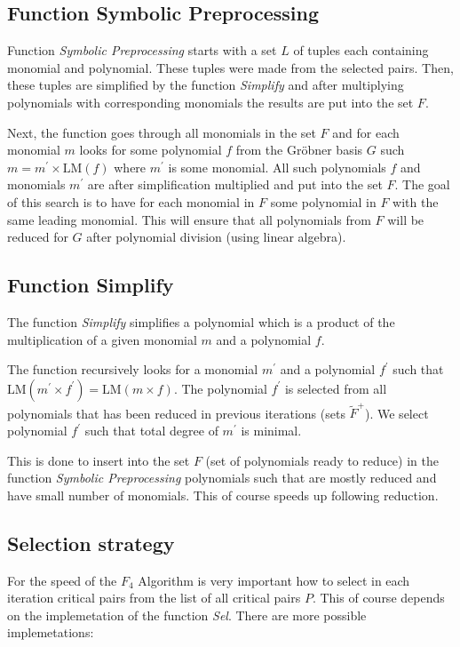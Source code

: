 

\subsection{Function Symbolic Preprocessing}
Function \textit{Symbolic Preprocessing} starts with a set $L$ of tuples each containing monomial and polynomial. These tuples were made from the selected pairs. Then, these tuples are simplified by the function \textit{Simplify} and after multiplying polynomials with corresponding monomials the results are put into the set $F$.

Next, the function goes through all monomials in the set $F$ and for each monomial $m$ looks for some polynomial $f$ from the Gr\"obner basis $G$ such $m = m^\prime \times \textrm{LM}(f)$ where $m^\prime$ is some monomial. All such polynomials $f$ and monomials $m^\prime$ are after simplification multiplied and put into the set $F$. The goal of this search is to have for each monomial in $F$ some polynomial in $F$ with the same leading monomial. This will ensure that all polynomials from $F$ will be reduced for $G$ after polynomial division (using linear algebra).



\subsection{Function Simplify}
The function \textit{Simplify} simplifies a polynomial which is a product of the multiplication of a given monomial $m$ and a polynomial $f$.

The function recursively looks for a monomial $m^\prime$ and a polynomial $f^\prime$ such that $\textrm{LM}(m^\prime\times f^\prime) = \textrm{LM}(m\times f)$. The polynomial $f^\prime$ is selected from all polynomials that has been reduced in previous iterations (sets $\tilde{F}^+$). We select polynomial $f^\prime$ such that total degree of $m^\prime$ is minimal.

This is done to insert into the set $F$ (set of polynomials ready to reduce) in the function \textit{Symbolic Preprocessing} polynomials such that are mostly reduced and have small number of monomials. This of course speeds up following reduction.



\subsection{Selection strategy}
\label{subsec:F4:sel}
For the speed of the $F_4$ Algorithm is very important how to select in each iteration critical pairs from the list of all critical pairs $P$. This of course depends on the implemetation of the function \textit{Sel}. There are more possible implemetations:

